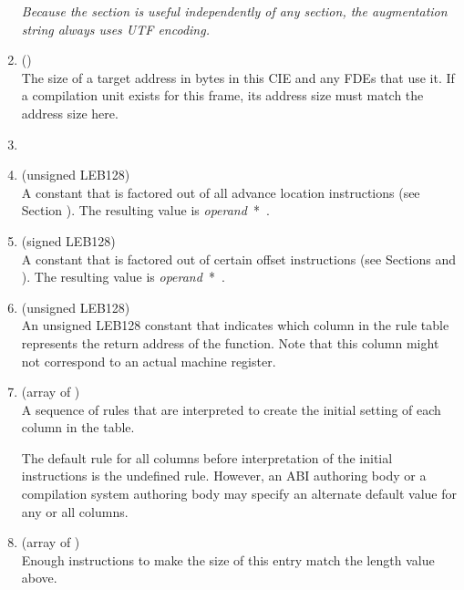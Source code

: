 \begin{enumerate}[1. ]
\textit{Because the \dotdebugframe{} section is useful independently of
any \dotdebuginfo{} section, the augmentation string always uses
UTF encoding.}

\item \HFNaddresssize{} (\HFTubyte) \\
The size of a target address in 
\bb
bytes in
\eb
this CIE and any FDEs that
use it. If a compilation unit exists for this frame,
its address size must match the address size here.

\item \HFNreservedwassegmentselectorsize{}
\bbeb
\\

\item \HFNcodealignmentfactor{} (unsigned LEB128) 
 \\
A 
constant that is factored out of all advance location
instructions (see Section ).
The resulting value is  
\mbox{\textit{operand} * \HFNcodealignmentfactor}.

\item  \HFNdataalignmentfactor{} (signed LEB128)
 \\
A 
constant that is factored out of certain offset instructions
(see Sections  and 
).
The resulting value is  \mbox{\textit{operand} * \HFNdataalignmentfactor}.

\item  \HFNreturnaddressregister{} (unsigned LEB128) \\
An unsigned LEB128 constant that indicates which column in the
rule table represents the return address of the function. Note
that this column might not correspond to an actual machine
register.

\item \HFNinitialinstructions{} (array of \HFTubyte) \\
A sequence of rules that are interpreted to create the initial
setting of each column in the table.  

The default rule for
all columns before interpretation of the initial instructions
is the undefined rule. However, an ABI authoring body or a
compilation system authoring body may specify an alternate
default value for any or all columns.

\item \HFNpadding{} (array of \HFTubyte) \\
Enough \DWCFAnop{} instructions to make the size of this entry
match the length value above.
\end{enumerate}

